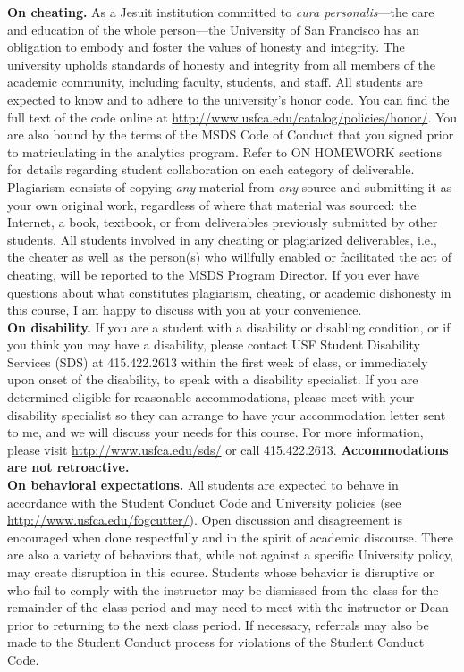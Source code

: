 \documentclass[11pt]{article}
\begin{document}
\noindent \textbf{On cheating.} As a Jesuit institution committed to \emph{cura personalis}---the care and education of the whole person---the University of San Francisco has an obligation to embody and foster the values of honesty and integrity. The university upholds standards of honesty and integrity from all members of the academic community, including faculty, students, and staff. All students are expected to know and to adhere to the university's honor code. You can find the full text of the code online at \url{http://www.usfca.edu/catalog/policies/honor/}. You are also bound by the terms of the MSDS Code of Conduct that you signed prior to matriculating in the analytics program. Refer to ON HOMEWORK sections for details regarding student collaboration on each category of deliverable. Plagiarism consists of copying \emph{any} material from \emph{any} source and submitting it as your own original work, regardless of where that material was sourced: the Internet, a book, textbook, or from deliverables previously submitted by other students. All students involved in any cheating or plagiarized deliverables, i.e., the cheater as well as the person(s) who willfully enabled or facilitated the act of cheating, will be reported to the MSDS Program Director. If you ever have questions about what constitutes plagiarism, cheating, or academic dishonesty in this course, I am happy to discuss with you at your convenience.\\

\noindent \textbf{On disability.} If you are a student with a disability or disabling condition, or if you think you may have a disability, please contact USF Student Disability Services (SDS) at 415.422.2613 within the first week of class, or immediately upon onset of the disability, to speak with a disability specialist. If you are determined eligible for reasonable accommodations, please meet with your disability specialist so they can arrange to have your accommodation letter sent to me, and we will discuss your needs for this course. For more information, please visit \url{http://www.usfca.edu/sds/} or call 415.422.2613. {\bf Accommodations are not retroactive.}\\

\noindent \textbf{On behavioral expectations.} All students are expected to behave in accordance with the Student Conduct Code and University policies (see \url{http://www.usfca.edu/fogcutter/}).  Open discussion and disagreement is encouraged when done respectfully and in the spirit of academic discourse. There are also a variety of behaviors that, while not against a specific University policy, may create disruption in this course. Students whose behavior is disruptive or who fail to comply with the instructor may be dismissed from the class for the remainder of the class period and may need to meet with the instructor or Dean prior to returning to the next class period. If necessary, referrals may also be made to the Student Conduct process for violations of the Student Conduct Code. \\
\end{document}
